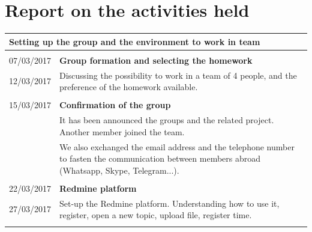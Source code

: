 %



\chapter{Report on the activities held}
\begin{table}[h]
	\begin{tabular}{p{2.1cm}|  p{13.5cm}}
\multicolumn{2}{p{15.0cm}}{ \LARGE{{Setting up the group and the environment to work in team}}}\\
\hline \hline 
\multicolumn{2}{p{1.0cm}}{ \Large{{}}}\\
	07/03/2017 & \textbf{Group formation and selecting the homework}\\
	12/03/2017& Discussing the possibility to work in a team of 4 people, and the preference of the homework available. \\
	\multicolumn{2}{p{1.0cm}}{ \Large{{ }}}\\	
	15/03/2017 & \textbf{Confirmation of the group}	 \\
	&It has been announced the groups and the related project. Another member joined the team. \\
	&We also exchanged the email address and the telephone number to fasten the communication between members abroad (Whatsapp, Skype, Telegram...).\\
		\multicolumn{2}{p{1.0cm}}{ \Large{{ }}}\\
		22/03/2017 & \textbf{Redmine platform}\\
		27/03/2017& Set-up the Redmine platform. Understanding how to use it, register, open a new topic, upload file, register time. \\
		\multicolumn{2}{p{1.0cm}}{ \Large{{ }}}\\	

\end{tabular}
\end{table}	
